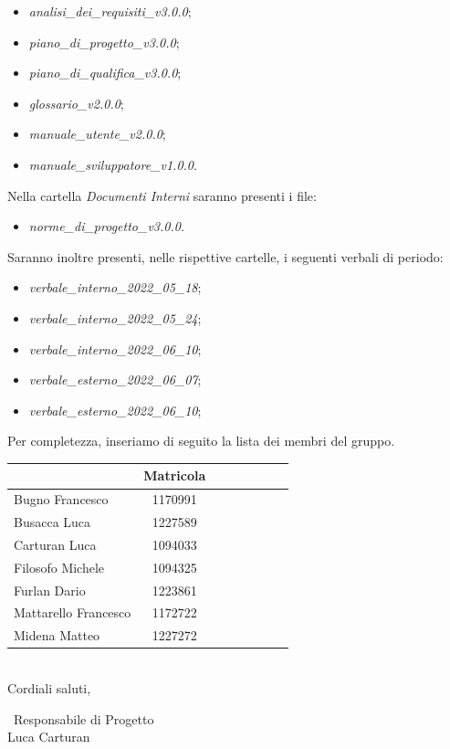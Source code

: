 \documentclass[a4paper, 10pt]{article}
\begin{document}
\begin{itemize}
    \item \textit{analisi\_dei\_requisiti\_v3.0.0};
    \item \textit{piano\_di\_progetto\_v3.0.0};
    \item \textit{piano\_di\_qualifica\_v3.0.0};
    \item \textit{glossario\_v2.0.0};
    \item \textit{manuale\_utente\_v2.0.0};
    \item \textit{manuale\_sviluppatore\_v1.0.0}.
\end{itemize}
Nella cartella \textit{Documenti Interni} saranno presenti i file:
\begin{itemize}
    \item \textit{norme\_di\_progetto\_v3.0.0}.
\end{itemize}
Saranno inoltre presenti, nelle rispettive cartelle, i seguenti verbali di periodo:
\begin{itemize}
    \item \textit{verbale\_interno\_2022\_05\_18};
    \item \textit{verbale\_interno\_2022\_05\_24};
    \item \textit{verbale\_interno\_2022\_06\_10};
    \item \textit{verbale\_esterno\_2022\_06\_07};
    \item \textit{verbale\_esterno\_2022\_06\_10};
\end{itemize}
Per completezza, inseriamo di seguito la lista dei membri del gruppo.
\begin{table}[H]
    \centering
    \renewcommand{\arraystretch}{1.8}
    \begin{tabular}{l|cccccc|c}
      \rowcolor[HTML]{125E28} 
      \multicolumn{1}{c}{\color[HTML]{FFFFFF}\textbf{Nome}} 
      & \color[HTML]{FFFFFF}\textbf{Matricola}\\
      \hline
      Bugno Francesco & 1170991\\
      Busacca Luca & 1227589\\
      Carturan Luca & 1094033\\
      Filosofo Michele & 1094325\\
      Furlan Dario & 1223861\\
      Mattarello Francesco & 1172722\\
      Midena Matteo & 1227272\\
      \hline             
    \end{tabular}
  \end{table}
\textbf{}\\
Cordiali saluti,\\
\begin{flushright}
    \
    Responsabile di Progetto\\
    Luca Carturan \hspace{1.1cm}\hspace{1cm}
\end{flushright}
\end{document}
